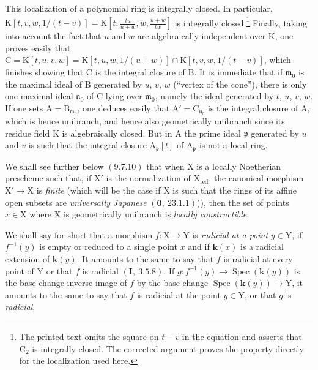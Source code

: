 This localization of a polynomial ring is integrally closed. In particular,
$\mathrm{K}[t,v,w,1/(t-v)]=\mathrm{K}[t,\frac{tu}{u+w},w,\frac{u+w}{tw}]$ is integrally closed.\footnote{The printed text omits the square on $t-v$ in the equation and asserts that $\mathrm{C}_2$ is integrally closed. The corrected argument proves the property directly for the localization used here.}
Finally, taking into
account the fact that $u$ and $w$ are algebraically independent over $\mathrm{K}$, one proves easily
that $\mathrm{C}=\mathrm{K}[t,u,v,w]=\mathrm{K}[t,u,w,1/(u+w)]\cap\mathrm{K}[t,v,w,1/(t-v)]$, which finishes
showing that $\mathrm{C}$ is the integral closure of $\mathrm{B}$. It is immediate that if $\mathfrak{m}_0$ is the maximal ideal
of $\mathrm{B}$ generated by $u$, $v$, $w$ (``vertex of the cone''), there is only one maximal
ideal $\mathfrak{n}_0$ of $\mathrm{C}$ lying over $\mathfrak{m}_0$, namely the ideal generated by $t$, $u$, $v$, $w$. If one sets $\mathrm{A}=\mathrm{B}_{\mathfrak{m}_0}$, one deduces
easily that $\mathrm{A}'=\mathrm{C}_{\mathfrak{n}_0}$ is the integral closure of $\mathrm{A}$, which is hence unibranch, and hence
also geometrically unibranch since its residue field $\mathrm{K}$ is algebraically closed.
But in $\mathrm{A}$ the prime ideal $\mathfrak{p}$ generated by $u$ and $v$ is such that the integral
closure $\mathrm{A}_\mathfrak{p}[t]$ of $\mathrm{A}_\mathfrak{p}$ is not a local ring.

We shall see further below $(9.7.10)$ that when $\mathrm{X}$ is a locally Noetherian prescheme
such that, if $\mathrm{X}'$ is the normalization of $\mathrm{X}_{\mathrm{red}}$, the canonical morphism $\mathrm{X}'\to\mathrm{X}$
is \emph{finite} (which will be the case if $\mathrm{X}$ is such that the rings of its affine open subsets are
\emph{universally Japanese} $(\mathbf{0},~23.1.1)$)), then the set of points $x\in\mathrm{X}$ where $\mathrm{X}$ is geometrically
unibranch is \emph{locally constructible}.

\begin{env}[6.15.3]
\label{IV.6.15.3}
We shall say for short that a morphism $f:\mathrm{X}\to\mathrm{Y}$ is \emph{radicial at a
point} $y\in\mathrm{Y}$, if $f^{-1}(y)$ is empty or reduced to a single point $x$ and if $\boldsymbol{k}(x)$ is a radicial extension
of $\boldsymbol{k}(y)$. It amounts to the same to say that $f$ is radicial at every point of $\mathrm{Y}$
or that $f$ is radicial $(\mathbf{I},~3.5.8)$. If $g:f^{-1}(y)\to\operatorname{Spec}(\boldsymbol{k}(y))$ is the base change inverse
image of $f$ by the base change $\operatorname{Spec}(\boldsymbol{k}(y))\to\mathrm{Y}$, it amounts to the same to say that $f$
is radicial at the point $y\in\mathrm{Y}$, or that $g$ is \emph{radicial}.
\end{env}

